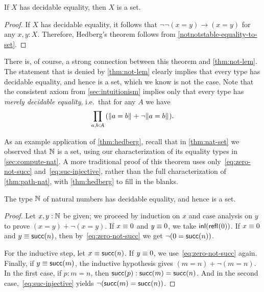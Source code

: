 \begin{thm}[Hedberg]\label{thm:hedberg}
  If $X$ has decidable equality, then $X$ is a set.
\end{thm}

\begin{proof}
If $X$ has decidable equality, it follows that $\neg\neg(x=y)\to(x=y)$ for any
$x,y:X$. Therefore, Hedberg's theorem follows from 
\autoref{notnotstable-equality-to-set}.
\end{proof}

There is, of course, a strong connection between this theorem and \autoref{thm:not-lem}.
The statement \LEM{\infty} that is denied by \autoref{thm:not-lem} clearly implies that every type has decidable equality, and hence is a set, which we know is not the case.
%
Note that the consistent axiom \LEM{} from \autoref{sec:intuitionism} implies only that every type has \emph{merely decidable equality}, i.e.\ that for any $A$ we have
%
%
\[ \prd{a,b:A} (\brck{a=b} + \neg\brck{a=b}). \]

%

As an example application of \autoref{thm:hedberg}, recall that in \autoref{thm:nat-set} we observed that $\mathbb{N}$ is a set, using our characterization of its equality types in
\autoref{sec:compute-nat}.
A more traditional proof of this theorem uses only~\eqref{eq:zero-not-succ} and~\eqref{eq:suc-injective}, rather than the full
characterization of \autoref{thm:path-nat}, with \autoref{thm:hedberg} to fill in the blanks.

\begin{thm}\label{prop:nat-is-set}
 The type $\mathbb{N}$ of natural numbers has decidable equality, and hence is a set.
\end{thm}

\begin{proof}
  Let $x, y : \mathbb{N}$ be given; we proceed by induction on $x$ and case analysis on $y$ to prove $(x=y)+\neg(x=y)$.
  If $x \equiv 0$ and $y \equiv 0$, we take ${\mathsf{inl}}(\mathsf{refl}_{}(0))$.
  If $x \equiv 0$ and $y \equiv \mathsf{succ}(n)$, then by~\eqref{eq:zero-not-succ} we get $\neg (0 = \mathsf{succ} (n))$.

  For the inductive step, let $x \equiv \mathsf{succ} (n)$.
  If $y \equiv 0$, we use~\eqref{eq:zero-not-succ} again.
  Finally, if $y \equiv \mathsf{succ} (m)$, the inductive hypothesis gives $(m = n)+\neg(m = n)$.
  In the first case, if $p:m=n$, then ${\mathsf{succ}}\mathopen{}\left({p}\right)\mathclose{}:\mathsf{succ}(m)=\mathsf{succ}(n)$.
  And in the second case,~\eqref{eq:suc-injective} yields $\neg(\mathsf{succ}(m)=\mathsf{succ}(n))$.
\end{proof}

